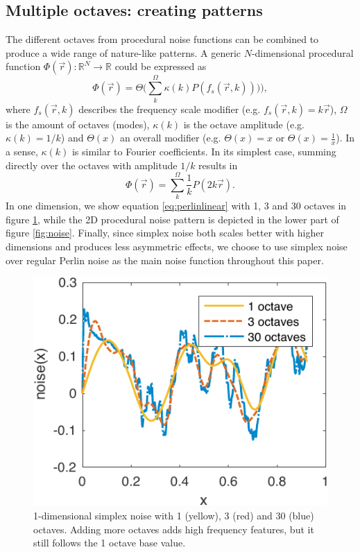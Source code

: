 \documentclass[aps,pre,twocolumn,letterpaper,floatfix,showpacs]{revtex4}
\begin{document}
\subsection{Multiple octaves: creating patterns}
\label{sec:octaves}
The different octaves from procedural noise functions can be combined
to produce a wide range of nature-like patterns. A generic
$N$-dimensional procedural function $\Phi(\vec r): \mathbb R^N \to
\mathbb R$ could be expressed as
\begin{equation}
\label{eq:procedural}
 \Phi(\vec r) = \Theta \Big(\sum_k^\Omega \kappa (k) P(  f_s (\vec r,k) )) \Big),
 \end{equation}
where $f_s(\vec r,k)$ describes the frequency scale modifier (e.g. $f_s(\vec r,k) =
k\vec r$), $\Omega$ is the amount of octaves (modes), $\kappa(k)$ is the octave amplitude (e.g. $\kappa(k) = 1/k$)
and $\Theta(x)$ an overall modifier (e.g. $\Theta(x) = x$ or
$\Theta(x) = \frac{1}{x}$). In a sense, $\kappa(k)$ is similar to Fourier coefficients. 
In its simplest case, summing directly over the octaves with amplitude $1/k$ results in 
\begin{equation}
\label{eq:perlinlinear}
 \Phi(\vec r) = \sum_k^\Omega \frac{1}{k} P( 2k\vec r).
\end{equation}
In one dimension, we show equation \ref{eq:perlinlinear} with 1, 3 and 30 octaves
in figure \ref{fig:1dperlin}, while the 2D procedural noise pattern is depicted in the lower
part of figure \ref{fig:noise}. Finally, since simplex noise both scales better
with higher dimensions and produces less asymmetric effects, we choose to use
simplex noise over regular Perlin noise as the main noise function throughout this paper.

\begin{figure}
\includegraphics[width=.5\textwidth]{1d_noise.pdf}
\caption{1-dimensional simplex noise with 1 (yellow), 3 (red) and 30 (blue) octaves. Adding more octaves adds high frequency features, but it still follows the 1 octave base value.}
\label{fig:1dperlin}
\end{figure}
\end{document}

